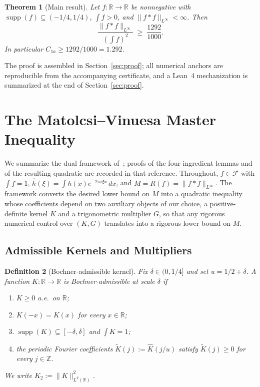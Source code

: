 \documentclass[11pt, letterpaper]{article}
\theoremstyle{paperplain}
\newtheorem{theorem}{Theorem}[section]
\theoremstyle{paperdef}
\newtheorem{definition}[theorem]{Definition}
\newcommand{\R}{\mathbb{R}}
\newcommand{\Z}{\mathbb{Z}}
\newcommand{\Linf}{L^\infty}
\newcommand{\supp}{\operatorname{supp}}
\begin{document}
\begin{theorem}[Main result]
\label{thm:main}
Let $f:\R\to\R$ be nonnegative with
$\supp(f)\subseteq(-1/4,1/4)$, $\int f>0$, and
$\|f*f\|_{\Linf}<\infty$.  Then
\[
  \frac{\|f*f\|_{\Linf}}{\left(\int f\right)^2}
  \;\ge\;
  \frac{1292}{1000}.
\]
In particular $C_{1a}\ge 1292/1000=1.292$.
\end{theorem}

The proof is assembled in Section~\ref{sec:proof}; all numerical
anchors are reproducible from the accompanying certificate, and a
Lean~4 mechanization is summarized at the end of
Section~\ref{sec:proof}.

\section{The Matolcsi--Vinuesa Master Inequality}\label{sec:mv}

We summarize the dual framework of~\cite[\S 3]{MV10}; proofs of the
four ingredient lemmas and of the resulting quadratic are recorded
in that reference.  Throughout, $f\in\mathcal{F}$ with $\int f=1$,
$\widehat{h}(\xi)=\int h(x)e^{-2\pi i\xi x}\,dx$, and
$M=R(f)=\|f*f\|_{\Linf}$.  The framework converts the desired lower
bound on $M$ into a quadratic inequality whose coefficients depend on
two auxiliary objects of our choice, a positive-definite kernel $K$
and a trigonometric multiplier $G$, so that any rigorous numerical
control over $(K,G)$ translates into a rigorous lower bound on $M$.

\subsection{Admissible Kernels and Multipliers}\label{subsec:mv-defs}

\begin{definition}[Bochner-admissible kernel]
\label{def:bochner}
Fix $\delta\in(0,1/4]$ and set $u=1/2+\delta$.  A function
$K:\R\to\R$ is \emph{Bochner-admissible at scale $\delta$} if
\begin{enumerate}[label=\textnormal{(K\arabic*)}, leftmargin=2.4em]
\item $K\ge 0$ a.e.\ on $\R$;
\item $K(-x)=K(x)$ for every $x\in\R$;
\item $\supp(K)\subseteq[-\delta,\delta]$ and $\int K=1$;
\item the periodic Fourier coefficients
      $\widetilde{K}(j):=\widehat{K}(j/u)$ satisfy
      $\widetilde{K}(j)\ge 0$ for every $j\in\Z$.
\end{enumerate}
We write $K_2:=\|K\|_{L^2(\R)}^2$.
\end{definition}
\end{document}
